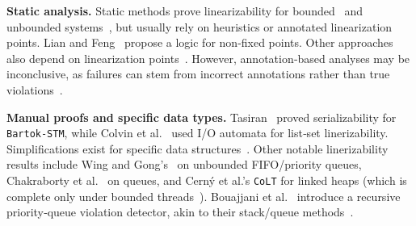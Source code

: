 

\smallskip
\noindent
\textbf{Static analysis.}
Static methods prove linearizability for bounded~\cite{AmRiReSaYa07,MaLeSaRaBe08} and unbounded systems~\cite{BeLeMaRaSa08,Va09,Va10}, but usually rely on heuristics or annotated linearization points.  
	Lian and Feng~\cite{LiFe13} propose a logic for non‐fixed points.  
	Other approaches also depend on linearization points~\cite{OhRiVeYaYo10,ZhPeHa15,AbJoTr16}.  
	However, annotation‐based analyses may be inconclusive, as failures can stem from incorrect annotations rather than true violations~\cite{BoEmCoHa15}.

\smallskip
\noindent
\textbf{Manual proofs and specific data types.}
Tasiran~\cite{Ta08} proved serializability for \texttt{Bartok-STM}, while Colvin et al.~\cite{CoGrLuMo06} used I/O automata for list‐set linerizability.  
	Simplifications exist for specific data structures~\cite{BoEmEnMu17,FeEnMoRiSh18}.
	Other notable linerizability results include Wing and Gong's~\cite{WiGo93} on unbounded FIFO/priority queues, Chakraborty et al.~\cite{ChHeSeVa15} on queues, and Cerný et al.’s \texttt{CoLT} for linked heaps (which is complete only under bounded threads~\cite{CeRaZuChAl10}).  
	Bouajjani et al.~\cite{BoEnWa17} introduce a recursive priority‐queue violation detector, akin to their stack/queue methods~\cite{BoEmEnHa18}.

